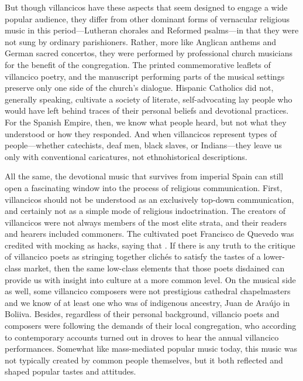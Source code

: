 But though villancicos have these aspects that seem designed to engage a wide
popular audience, they differ from other dominant forms of vernacular religious
music in this period---Lutheran chorales and Reformed psalms---in that they were
not sung by ordinary parishioners.
Rather, more like Anglican anthems and German sacred concertos, they were
performed by professional church musicians for the benefit of the congregation.
The printed commemorative leaflets of villancico poetry, and the manuscript
performing parts of the musical settings preserve only one side of the church's
dialogue.
Hispanic Catholics did not, generally speaking, cultivate a society of literate,
self-advocating lay people who would have left behind traces of their personal
beliefs and devotional practices.
For the Spanish Empire, then, we know what people heard, but not what they
understood or how they responded.%
    \Autocite{Burstyn:PeriodEar} %
And when villancicos represent types of people---whether catechists, deaf men,
black slaves, or Indians---they leave us only with conventional caricatures, not
ethnohistorical descriptions.%
    \Autocites
    {Baker:EthnicVC}
    {Baker:PerformancePostColonial}
    {Davies:LocalContent}

All the same, the devotional music that survives from imperial Spain
can still open a fascinating window into the process of religious communication.
First, villancicos should not be understood as an exclusively top-down
communication, and certainly not as a simple mode of religious indoctrination.
The creators of villancicos were not always members of the most elite strata,
and their readers and hearers included commoners.
The cultivated poet Francisco de Quevedo was credited with mocking  as hacks, saying that .%
    \Autocite
    [37: .]
    {Torres:SuenosMorales}
If there is any truth to the critique of villancico poets as stringing together
clichés to satisfy the tastes of a lower-class market, then the same low-class
elements that those poets disdained can provide us with insight into culture at
a more common level.
On the musical side as well, some villancico composers were not prestigious
cathedral chapelmasters and we know of at least one who was of indigenous
ancestry, Juan de Araújo in Boliiva.%
    \Autocite{Illari:Popular}
Besides, regardless of their personal background, villancio poets and composers
were following the demands of their local congregation, who according to
contemporary accounts turned out in droves to hear the annual villancico
performances.
Somewhat like mass-mediated popular music today, this music was not typically
created by common people themselves, but it both reflected and shaped popular
tastes and attitudes.

